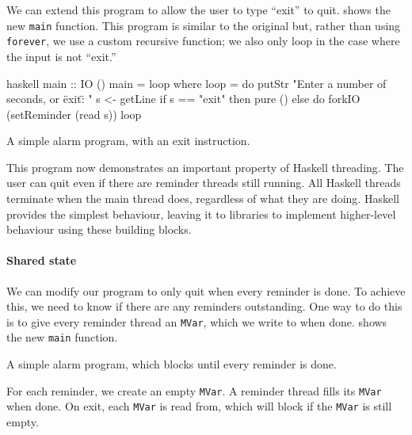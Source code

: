 We can extend this program to allow the user to type ``exit'' to quit.
 shows the new \verb|main| function.  This program is
similar to the original but, rather than using \verb|forever|, we use
a custom recursive function; we also only loop in the case where the
input is not ``exit.''

\begin{listing}
\centering
\begin{cminted}{haskell}
main :: IO ()
main = loop where
  loop = do
    putStr "Enter a number of seconds, or \"exit\": "
    s <- getLine
    if s == "exit"
      then pure ()
      else do
        forkIO (setReminder (read s))
        loop
\end{cminted}
\caption{A simple alarm program, with an exit instruction.}\label{lst:ch_ex2}
\end{listing}

This program now demonstrates an important property of Haskell
threading.  The user can quit even if there are reminder threads still
running.  All Haskell threads terminate when the main thread does,
regardless of what they are doing.  Haskell provides the simplest
behaviour, leaving it to libraries to implement higher-level behaviour
using these building blocks.

\paragraph{Shared state}
We can modify our program to only quit when every reminder is done.
To achieve this, we need to know if there are any reminders
outstanding.  One way to do this is to give every reminder thread an
\verb|MVar|, which we write to when done.   shows the
new \verb|main| function.

\begin{listing}
\centering
{}
\caption{A simple alarm program, which blocks until every reminder is done.}\label{lst:ch_ex3}
\end{listing}

For each reminder, we create an empty \verb|MVar|.  A reminder thread
fills its \verb|MVar| when done.  On exit, each \verb|MVar| is read
from, which will block if the \verb|MVar| is still empty.

